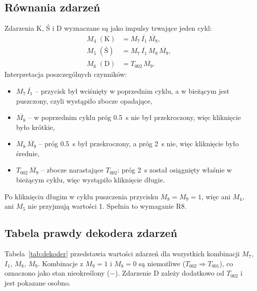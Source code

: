 \subsection{Równania zdarzeń}
Zdarzenia K, Ś i D wyznaczane są jako impulsy trwające jeden cykl:
\begin{align}
    M_4 \;(\mathrm{K}) &= M_7 \,\overline{I_1}\,\overline{M_8}, \label{eq:k}\\
    M_5 \;(\mathrm{Ś}) &= M_7 \,\overline{I_1}\, M_8\,\overline{M_9}, \label{eq:s}\\
    M_6 \;(\mathrm{D}) &= T_{002}\,\overline{M_9}. \label{eq:d}
\end{align}
Interpretacja poszczególnych czynników:
\begin{itemize}
    \item $M_7\,\overline{I_1}$ -- przycisk był wciśnięty w poprzednim
          cyklu, a w bieżącym jest puszczony, czyli wystąpiło zbocze
          opadające,
    \item $\overline{M_8}$ -- w poprzednim cyklu próg \SI{0,5}{\second}
          nie był przekroczony, więc kliknięcie było krótkie,
    \item $M_8\,\overline{M_9}$ -- próg \SI{0,5}{\second} był
          przekroczony, a próg \SI{2}{\second} nie, więc kliknięcie
          było średnie,
    \item $T_{002}\,\overline{M_9}$ -- zbocze narastające $T_{002}$:
          próg \SI{2}{\second} został osiągnięty właśnie w bieżącym
          cyklu, więc wystąpiło kliknięcie długie.
\end{itemize}
Po kliknięciu długim w cyklu puszczenia przycisku $M_8 = M_9 = 1$,
więc ani $M_4$, ani $M_5$ nie przyjmują wartości 1. Spełnia to
wymaganie R8.

\subsection{Tabela prawdy dekodera zdarzeń}
Tabela~\ref{tab:dekoder} przedstawia wartości zdarzeń dla wszystkich
kombinacji $M_7$, $I_1$, $M_8$, $M_9$. Kombinacje z $M_9 = 1$
i $M_8 = 0$ są niemożliwe ($T_{002} \Rightarrow T_{001}$), co
oznaczono jako stan nieokreślony ($-$). Zdarzenie D zależy dodatkowo
od $T_{002}$ i jest pokazane osobno.

